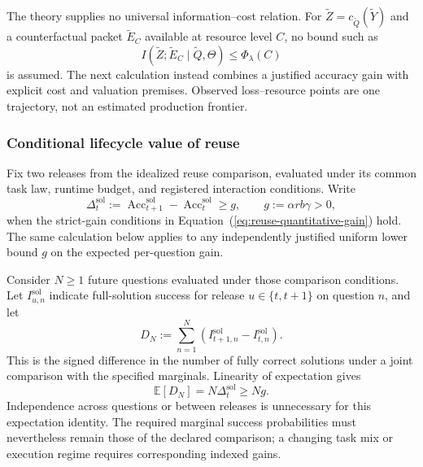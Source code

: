 \documentclass[10pt]{article} %
\renewcommand{\eqref}[1]{\textup{(\ref{#1})}}
\providecommand{\1}{\mathbf{1}}  %
\theoremstyle{remark}
\theoremstyle{definition}
\begin{document}
The theory supplies no universal information--cost relation. For
$\widetilde Z=c_{\widetilde Q}(\widetilde Y)$ and a counterfactual
packet $\widetilde E_C$ available at resource level $C$, no bound such as
\begin{equation}
I(\widetilde Z;\widetilde E_C\mid\widetilde Q,\Theta)
\leq\Phi_\lambda(C)
\label{eq:unassumed-cost-information-bridge}
\end{equation}
is assumed. The next calculation instead combines a justified accuracy
gain with explicit cost and valuation premises. Observed loss--resource
points are one trajectory, not an estimated production frontier.

\subsubsection{Conditional lifecycle value of reuse}
\label{subsubsec:reuse-lifecycle-value}

Fix two releases from the idealized reuse comparison, evaluated under
its common task law, runtime budget, and registered interaction
conditions. Write
\begin{equation}
\Delta_t^{\mathrm{sol}}
:=\operatorname{Acc}^{\mathrm{sol}}_{t+1}
-\operatorname{Acc}^{\mathrm{sol}}_t
\geq g,
\qquad g:=\alpha r b\gamma>0,
\label{eq:lifecycle-accuracy-premise}
\end{equation}
when the strict-gain conditions in
Equation~\eqref{eq:reuse-quantitative-gain} hold. The same calculation
below applies to any independently justified uniform lower bound $g$
on the expected per-question gain.

Consider $N\geq1$ future questions evaluated under those comparison
conditions. Let $I_{u,n}^{\mathrm{sol}}$ indicate full-solution success
for release $u\in\{t,t+1\}$ on question $n$, and let
\begin{equation}
D_N:=\sum_{n=1}^{N}
\left(I_{t+1,n}^{\mathrm{sol}}-I_{t,n}^{\mathrm{sol}}\right).
\label{eq:lifecycle-additional-solutions}
\end{equation}
This is the signed difference in the number of fully correct solutions
under a joint comparison with the specified marginals. Linearity of
expectation gives
\begin{equation}
\mathbb E[D_N]=N\Delta_t^{\mathrm{sol}}\geq Ng.
\label{eq:lifecycle-expected-gain}
\end{equation}
Independence across questions or between releases is unnecessary for
this expectation identity. The required marginal success probabilities
must nevertheless remain those of the declared comparison; a changing
task mix or execution regime requires corresponding indexed gains.
\end{document}
